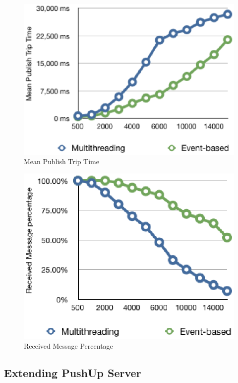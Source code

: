 \begin{figure}[htb!]
\centering%
    \includegraphics[scale=0.70]{figures/et_latency.eps}
    \caption{Mean Publish Trip Time}
    \label{fig:et_latency}
\end{figure}

\begin{figure}[htb!]
\centering%
    \includegraphics[scale=0.70]{figures/et_rate.eps}
    \caption{Received Message Percentage}
    \label{fig:et_rate}
\end{figure}


\subsection{Extending PushUp Server\\}

